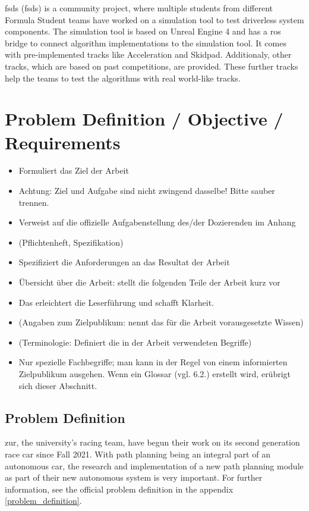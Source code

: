 \acrlong{fsds} (\acrshort{fsds}) is a community project, where multiple students from different Formula Student teams have worked on a simulation tool to test driverless system components. The simulation tool is based on Unreal Engine 4 \cite{unreal_engine} and has a \acrshort{ros} bridge to connect algorithm implementations to the simulation tool. It comes with pre-implemented tracks like Acceleration and Skidpad. Additionaly, other tracks, which are based on past competitions, are provided. These further tracks help the teams to test the algorithms with real world-like tracks.
\cite{fsds_github}

\section{Problem Definition / Objective / Requirements} \label{sec:Problem Definition / Objective / Requirements}
\begin{itemize}
    \item Formuliert das Ziel der Arbeit
    \item Achtung: Ziel und Aufgabe sind nicht zwingend dasselbe! Bitte sauber trennen.
    \item Verweist auf die offizielle Aufgabenstellung des/der Dozierenden im Anhang
    \item (Pflichtenheft, Spezifikation)
    \item Spezifiziert die Anforderungen an das Resultat der Arbeit
    \item Übersicht über die Arbeit: stellt die folgenden Teile der Arbeit kurz vor
    \item Das erleichtert die Leserführung und schafft Klarheit.
    \item (Angaben zum Zielpublikum: nennt das für die Arbeit vorausgesetzte Wissen)
    \item (Terminologie: Definiert die in der Arbeit verwendeten Begriffe)
    \item Nur spezielle Fachbegriffe; man kann in der Regel von einem informierten Zielpublikum ausgehen.
          Wenn ein Glossar (vgl. 6.2.) erstellt wird, erübrigt sich dieser Abschnitt.
\end{itemize}
\subsection{Problem Definition} \label{sec:Problem Definition}
\acrlong{zur}, the university's racing team, have begun their work on its second generation race car since Fall 2021. With path planning being an integral part of an autonomous car, the research and implementation of a new path planning module as part of their new autonomous system is very important. For further information, see the official problem definition in the appendix \ref{problem_definition}.

